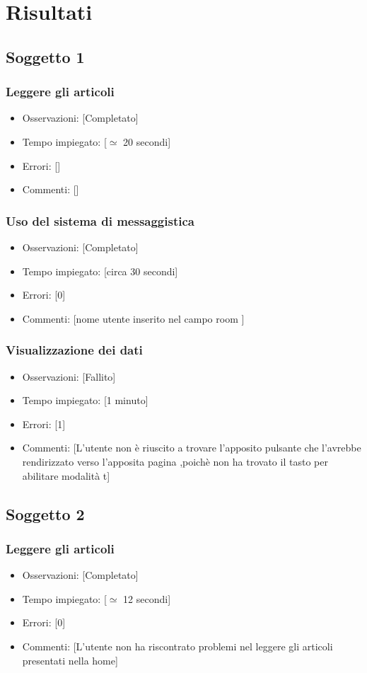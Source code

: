 \documentclass[a4paper,12pt]{article}
\begin{document}
\section{Risultati}
\subsection{Soggetto 1}
\subsubsection{Leggere gli articoli}
\begin{itemize}
    \item Osservazioni: [Completato]
    \item Tempo impiegato: [$\simeq$ 20 secondi]
    \item Errori: []
    \item Commenti: []
\end{itemize}
\subsubsection{Uso del sistema di messaggistica}
\begin{itemize}
    \item Osservazioni: [Completato]
    \item Tempo impiegato: [circa 30 secondi] 
    \item Errori: [0]
    \item Commenti: [nome utente inserito nel campo room ]
\end{itemize}
\subsubsection{Visualizzazione dei dati}
\begin{itemize}
    \item Osservazioni: [Fallito]
    \item Tempo impiegato: [1 minuto]
    \item Errori: [1]
    \item Commenti: [L'utente non è riuscito a trovare l'apposito pulsante che l'avrebbe rendirizzato verso l'apposita pagina ,poichè non ha trovato il tasto per abilitare modalità t]
\end{itemize}

\subsection{Soggetto 2}
\subsubsection{Leggere gli articoli}
\begin{itemize}
    \item Osservazioni: [Completato]
    \item Tempo impiegato: [$\simeq$ 12 secondi]
    \item Errori: [0]
    \item Commenti: [L'utente non ha riscontrato problemi nel leggere gli articoli presentati nella home]
\end{itemize}
\end{document}
